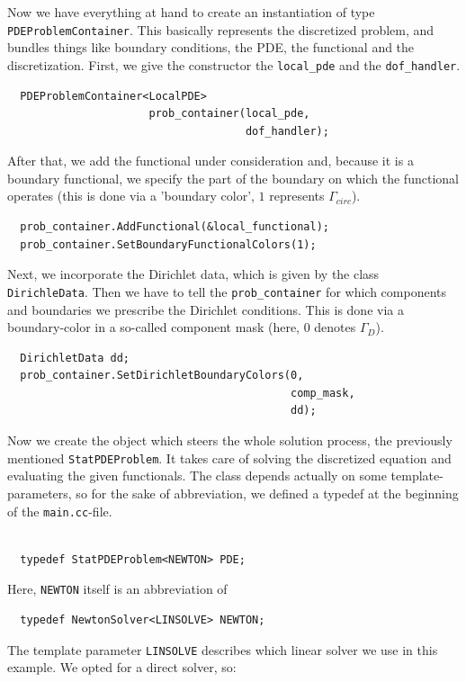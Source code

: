 \documentclass[smallextended]{svjour3}       %
\numberwithin{equation}{section}
\begin{document}
Now we have everything at hand to create an instantiation of type \texttt{PDEProblemContainer}. This basically represents the discretized problem, and bundles things like boundary conditions, the PDE, the functional and the discretization. First, we give the constructor the \texttt{local\_pde} and the \texttt{dof\_handler}.
\begin{lstlisting}
  PDEProblemContainer<LocalPDE> 
                      prob_container(local_pde,
                                     dof_handler);                                            
\end{lstlisting}
After that, we add the functional under consideration and, because it is a boundary functional, we specify the part of the boundary on which the functional operates (this is done via a 'boundary color', $1$ represents $\Gamma_{circ}$).
\begin{lstlisting}
  prob_container.AddFunctional(&local_functional);
  prob_container.SetBoundaryFunctionalColors(1);
\end{lstlisting}
Next, we incorporate the Dirichlet data, which is given by the class
\texttt{DirichleData}. Then we have to tell the \texttt{prob\_container} for
which components and boundaries we prescribe the Dirichlet conditions. This is
done via a boundary-color in a so-called component mask 
(here, $0$ denotes $\Gamma_D$).
\begin{lstlisting}
  DirichletData dd;
  prob_container.SetDirichletBoundaryColors(0,
                                            comp_mask,
                                            dd);
\end{lstlisting}
Now we create the object which steers the whole solution process, the previously mentioned \texttt{StatPDEProblem}. It takes care of solving the discretized equation and evaluating the given functionals. The class depends actually on some template-parameters, so for the sake of abbreviation, we defined a typedef at the beginning of the \texttt{main.cc}-file.
\begin{lstlisting}

  typedef StatPDEProblem<NEWTON> PDE;

\end{lstlisting}
Here, \texttt{NEWTON} itself is an abbreviation of
\begin{lstlisting}
  typedef NewtonSolver<LINSOLVE> NEWTON;
\end{lstlisting}
The  template parameter \texttt{LINSOLVE} describes which linear solver we use in this example. We opted for a direct solver, so: 
\end{document}
